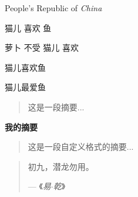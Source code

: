 \documentclass{article} %
\newcommand\PRC{People's Republic of \emph{China}}
\newcommand{\loves}[2]{#1 喜欢 #2}
\newcommand{\hatedby}[2]{#2 不受 #1 喜欢}
\newcommand{\love}[3][喜欢]{#2#1#3}
\newenvironment{myabstract}[1][摘要] %
{ %
	\begin{center}
		\bfseries #1  %
	\end{center}
	\begin{quotation}
}
{ %
	\end{quotation}
}
\newenvironment{Quotation}[1]
{ %
	\newcommand{\quotesource}{#1}
	\begin{quotation}
}
{ %
	\par\hfill--- 《\textit{\quotesource}》
	\end{quotation}
}
\begin{document}
	\PRC
	
	\loves{猫儿}{鱼}
	
	\hatedby{猫儿}{萝卜}
	
	\love{猫儿}{鱼}
	
	\love[最爱]{猫儿}{鱼}
	
	\begin{abstract}
		这是一段摘要...
	\end{abstract}

	\begin{myabstract}[我的摘要]
		这是一段自定义格式的摘要...
	\end{myabstract}

	\begin{Quotation}{易$\cdot$乾}
		初九，潜龙勿用。
	\end{Quotation}
\end{document}
